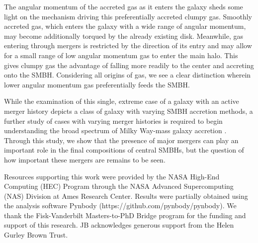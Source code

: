 \documentclass[]{emulateapj}
\begin{document}
The angular momentum of the accreted gas as it enters the galaxy sheds some light on the mechanism driving this preferentially accreted clumpy gas. Smoothly accreted gas, which enters the galaxy with a wide range of angular momentum, may become additionally torqued by the already existing disk. Meanwhile, gas entering through mergers is restricted by the direction of its entry and may allow for a small range of low angular momentum gas to enter the main halo. This gives clumpy gas the advantage of falling more readily to the center and accreting onto the SMBH. Considering all origins of gas, we see a clear distinction wherein lower angular momentum gas preferentially feeds the SMBH.

While the examination of this single, extreme case of a galaxy with an active merger history depicts a class of galaxy with varying SMBH accretion methods, a further study of cases with varying merger histories is required to begin understanding the broad spectrum of Milky Way-mass galaxy accretion \citep{Pontzen2016}. Through this study, we show that the presence of major mergers can play an important role in the final compositions of central SMBHs, but the question of how important these mergers are remains to be seen.



\acknowledgments
Resources supporting this work were provided by the NASA High-End Computing (HEC) Program through the NASA Advanced Supercomputing (NAS) Division at Ames Research Center. Results were partially obtained using the analysis software Pynbody (https://github.com/pynbody/pynbody). We thank the Fisk-Vanderbilt Masters-to-PhD Bridge program for the funding and support of this research. JB acknowledges generous support from the Helen Gurley Brown Trust.


\end{document}
